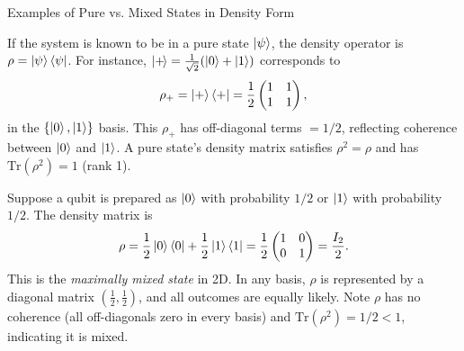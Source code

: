 \begin{frame}{Examples of Pure vs. Mixed States in Density Form}
  \begin{example}
    If the system is known to be in a pure state $\ket{\psi}$, the density operator is $\rho = \ket{\psi}\bra{\psi}$. For instance, $\ket{+\!} = \frac{1}{\sqrt{2}}(\ket{0}+\ket{1})$ corresponds to 
    \[
      \rho_{+} = \ket{+}\bra{+} = \frac{1}{2}\begin{pmatrix}1 & 1\\ 1 & 1\end{pmatrix},
    \] 
    in the $\{\ket{0},\ket{1}\}$ basis. This $\rho_{+}$ has off-diagonal terms $=1/2$, reflecting coherence between $\ket{0}$ and $\ket{1}$. A pure state's density matrix satisfies $\rho^2 = \rho$ and has $\mathrm{Tr}(\rho^2)=1$ (rank 1).
  \end{example}

  \begin{example}
    Suppose a qubit is prepared as $\ket{0}$ with probability $1/2$ or $\ket{1}$ with probability $1/2$. The density matrix is 
    \[
      \rho = \frac{1}{2}\ket{0}\bra{0} + \frac{1}{2}\ket{1}\bra{1} = \frac{1}{2}\begin{pmatrix}1 & 0\\0 & 1\end{pmatrix} = \frac{I_2}{2}.
    \] 
    This is the \emph{maximally mixed state} in 2D. In any basis, $\rho$ is represented by a diagonal matrix $(\frac{1}{2}, \frac{1}{2})$, and all outcomes are equally likely. Note $\rho$ has no coherence (all off-diagonals zero in every basis) and $\mathrm{Tr}(\rho^2)=1/2 < 1$, indicating it is mixed.
  \end{example}
\end{frame}

